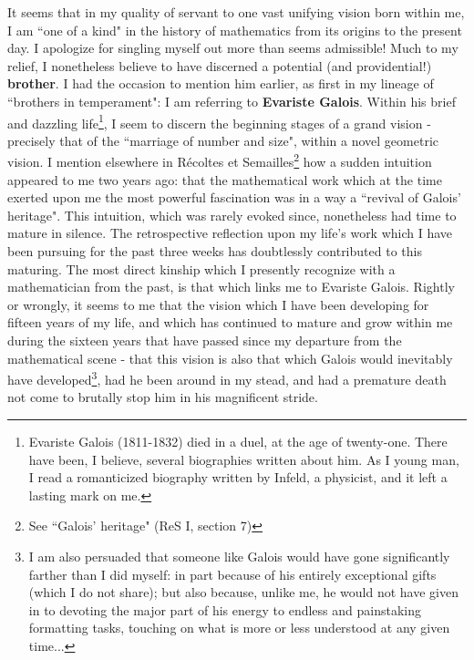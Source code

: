 It seems that in my quality of servant to one vast unifying vision born within me, I am ``one of a kind" in the history of mathematics from its origins to the present day. I apologize for singling myself out more than seems admissible! Much to my relief, I nonetheless believe to have discerned a potential (and providential!) \textbf{brother}. I had the occasion to mention him earlier, as first in my lineage of ``brothers in temperament": I am referring to \textbf{Evariste Galois}. Within his brief and dazzling life\footnote{Evariste Galois (1811-1832) died in a duel, at the age of twenty-one. There have been, I believe, several biographies written about him. As I young man, I read a romanticized biography written by Infeld, a physicist, and it left a lasting mark on me.}, I seem to discern the beginning stages of a grand vision - precisely that of the ``marriage of number and size", within a novel geometric vision. I mention elsewhere in R\'ecoltes et Semailles\footnote{See ``Galois' heritage" (ReS I, section 7)} how a sudden intuition appeared to me two years ago: that the mathematical work which at the time exerted upon me the most powerful fascination was in a way a ``revival of Galois' heritage". This intuition, which was rarely evoked since, nonetheless had time to mature in silence. The retrospective reflection upon my life's work which I have been pursuing for the past three weeks has doubtlessly contributed to this maturing. The most direct kinship which I presently recognize with a mathematician from the past, is that which links me to Evariste Galois. Rightly or wrongly, it seems to me that the vision which I have been developing for fifteen years of my life, and which has continued to mature and grow within me during the sixteen years that have passed since my departure from the mathematical scene - that this vision is also that which Galois would inevitably have developed\footnote{I am also persuaded that someone like Galois would have gone significantly farther than I did myself: in part because of his entirely exceptional gifts (which I do not share); but also because, unlike me, he would not have given in to devoting the major part of his energy to endless and painstaking formatting tasks, touching on what is more or less understood at any given time...}, had he been around in my stead, and had a premature death not come to brutally stop him in his magnificent stride.
 
